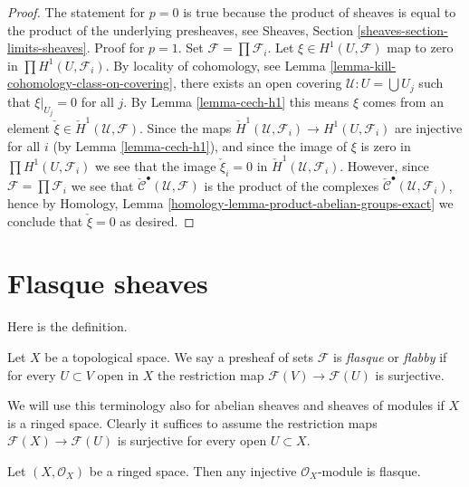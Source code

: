 \begin{proof}
The statement for $p = 0$ is true because the product of sheaves
is equal to the product of the underlying presheaves, see
Sheaves, Section \ref{sheaves-section-limits-sheaves}.
Proof for $p = 1$. Set $\mathcal{F} = \prod \mathcal{F}_i$.
Let $\xi \in H^1(U, \mathcal{F})$ map to zero in
$\prod H^1(U, \mathcal{F}_i)$. By locality of cohomology, see
Lemma \ref{lemma-kill-cohomology-class-on-covering},
there exists an open covering $\mathcal{U} : U = \bigcup U_j$ such that
$\xi|_{U_j} = 0$ for all $j$. By Lemma \ref{lemma-cech-h1} this means
$\xi$ comes from an element
$\check \xi \in \check H^1(\mathcal{U}, \mathcal{F})$.
Since the maps
$\check H^1(\mathcal{U}, \mathcal{F}_i) \to H^1(U, \mathcal{F}_i)$
are injective for all $i$ (by Lemma \ref{lemma-cech-h1}), and since
the image of $\xi$ is zero in $\prod H^1(U, \mathcal{F}_i)$ we see
that the image
$\check \xi_i = 0$ in $\check H^1(\mathcal{U}, \mathcal{F}_i)$.
However, since $\mathcal{F} = \prod \mathcal{F}_i$ we see that
$\check{\mathcal{C}}^\bullet(\mathcal{U}, \mathcal{F})$ is the
product of the complexes
$\check{\mathcal{C}}^\bullet(\mathcal{U}, \mathcal{F}_i)$,
hence by
Homology, Lemma \ref{homology-lemma-product-abelian-groups-exact}
we conclude that $\check \xi = 0$ as desired.
\end{proof}







\section{Flasque sheaves}
\label{section-flasque}

\noindent
Here is the definition.

\begin{definition}
\label{definition-flasque}
Let $X$ be a topological space. We say a presheaf of sets
$\mathcal{F}$ is {\it flasque} or {\it flabby} if for every
$U \subset V$ open in $X$ the restriction map
$\mathcal{F}(V) \to \mathcal{F}(U)$ is surjective.
\end{definition}

\noindent
We will use this terminology also for abelian sheaves and
sheaves of modules if $X$ is a ringed space.
Clearly it suffices to assume the restriction maps
$\mathcal{F}(X) \to \mathcal{F}(U)$ is surjective for every
open $U \subset X$.

\begin{lemma}
\label{lemma-injective-flasque}
Let $(X, \mathcal{O}_X)$ be a ringed space.
Then any injective $\mathcal{O}_X$-module is flasque.
\end{lemma}

